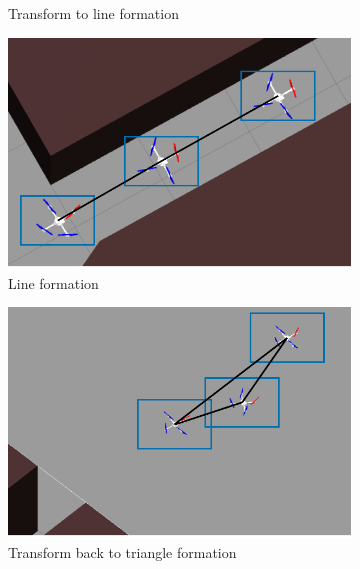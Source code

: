\begin{figure}[!]
\begin{subfigure}[b]{0.48\textwidth}
    \caption{Transform to line formation}
    \label{fig:1gazebo_3}
    \end{subfigure}
    \begin{subfigure}[b]{0.48\textwidth}
    \includegraphics[width=\textwidth]{paper2/images/gazebo_res4.pdf}
    \caption{Line formation}
    \label{fig:1gazebo_4}
    \end{subfigure}
    \begin{subfigure}[b]{0.48\textwidth}
    \includegraphics[width=\textwidth]{paper2/images/gazebo_res5.pdf}
    \caption{Transform back to triangle formation}
    \label{fig:1gazebo_5}
    \end{subfigure}
    \begin{subfigure}[b]{0.48\textwidth}

\end{subfigure}
\end{figure}
